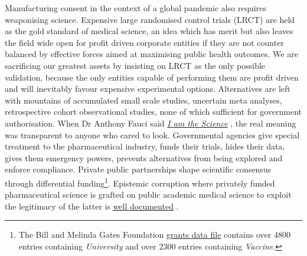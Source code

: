\documentclass[11pt,a4paper,notitlepage]{report}
\begin{document}
Manufacturing consent in the context of a global pandemic also requires weaponising science. Expensive large randomised control trials (LRCT) are held as the gold standard of medical science, an idea which has merit but also leaves the field wide open for profit driven corporate entities if they are not counter balanced by effective forces aimed at maximising public health outcomes. We are sacrificing our greatest assets by insisting on LRCT as the only possible validation, because the only entities capable of performing them are profit driven and will inevitably favour expensive experimental options. Alternatives are left with mountains of accumulated small scale studies, uncertain meta analyses, retrospective cohort observational studies, none of which sufficient for government authorisation. When Dr Anthony Fauci said \href{https://www.nationalreview.com/2021/11/anthony-fauci-i-am-the-science/}{\textit{I am the Science}} \cite{nationalreview29112021}, the real meaning was transparent to anyone who cared to look. Governmental agencies give special treatment to the pharmaceutical industry, funds their trials, hides their data, gives them emergency powers, prevents alternatives from being explored and enforce compliance. Private public partnerships shape scientific consensus through differential funding\footnote{The Bill and Melinda Gates Foundation \href{https://reporter.nih.gov/search/-bvPCvB7zkyvb1AjAgW5Yg/project-details/8674931}{grants data file} \cite{bmgf-grants} contains over 4800 entries containing \textit{University} and over 2300 entries containing \textit{Vaccine}.}. Epistemic corruption where privately funded pharmaceutical science is grafted on public academic medical science to exploit the legitimacy of the latter is \href{https://www.ncbi.nlm.nih.gov/pmc/articles/PMC8028448/}{well documented} \cite{Sismondo2021-xe}.  
\end{document}
